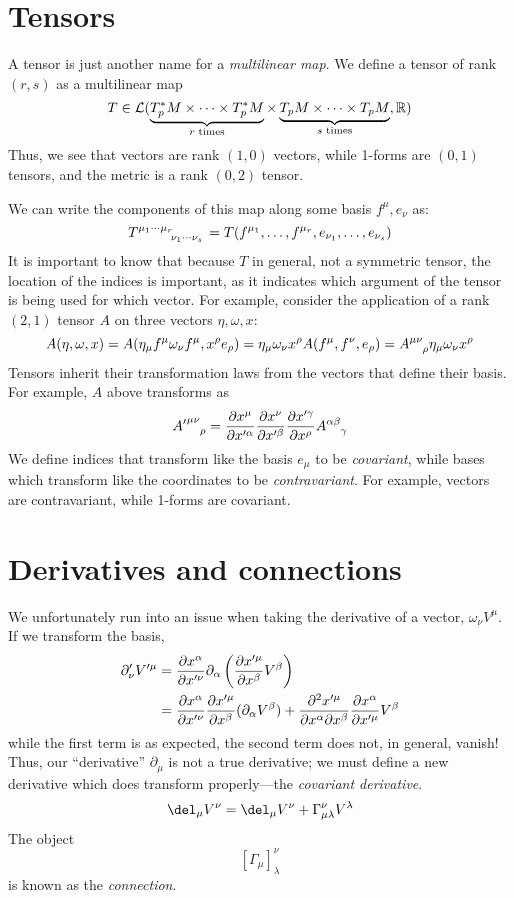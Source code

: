 \section{Tensors}
A tensor is just another name for a \emph{multilinear map}. We define a tensor of rank \((r,s)\) as a multilinear map
\[T\in \L(\underbrace{T_p\ast M\times\cdots\times T_p\ast M}_{\text{\(r\) times}}\times \underbrace{T_p M\times\cdots\times T_p M}_{\text{\(s\) times}}, \R)\]
Thus, we see that vectors are rank \((1,0)\) vectors, while 1-forms are \((0,1)\) tensors, and the metric is a rank \((0,2)\) tensor.

We can write the components of this map along some basis \(f^\mu, e_\nu\) as:
\[T\indices{^{\mu_1}^\cdots^{\mu_r}_{\nu_1}_\cdots_{\nu_s}} = T(f^{\mu_1},\ldots,f^{\mu_r}, e_{\nu_1},\ldots,e_{\nu_s})\]
It is important to know that because \(T\) in general, not a symmetric tensor, the location of the indices is important, as it indicates which argument of the tensor is being used for which vector. For example, consider the application of a rank \((2,1)\) tensor \(A\) on three vectors \(\eta, \omega, x\):
\[A(\eta,\omega,x) = A(\eta_\mu f^\mu \omega_\nu f^\mu, x^\rho e_\rho) = \eta_\mu \omega_\nu x^\rho A(f^\mu, f^\nu, e_\rho) = A\indices{^\mu^\nu_\rho}\eta_\mu\omega_\nu x^\rho\]
Tensors inherit their transformation laws from the vectors that define their basis. For example, \(A\) above transforms as
\[{A'}\indices{^\mu^\nu_\rho} = \pder{x^\mu}{x'^\alpha}\pder{x^\nu}{x'^\beta} \pder{x'^\gamma}{x^\rho}A\indices{^\alpha^\beta_\gamma}\]
We define indices that transform like the basis \(e_\mu\) to be \emph{covariant}, while bases which transform like the coordinates to be \emph{contravariant}. For example, vectors are contravariant, while 1-forms are covariant.

\section{Derivatives and connections}
We unfortunately run into an issue when taking the derivative of a vector, \(\omega_\nu V^\mu\). If we transform the basis,
\begin{align*}
	\partial_\nu' V'^\mu&=\frac{\partial x^\alpha}{\partial x'^\nu}\partial_\alpha\left(\frac{\partial x'^\mu}{\partial x^\beta}V^\beta\right)\\
			    &=\frac{\partial x^\alpha}{\partial x'^\nu}\frac{\partial x'^\mu}{\partial x^\beta}(\partial_\alpha V^\beta) + \frac{\partial ^2 x'^\mu}{\partial x^\alpha\partial x^\beta}\frac{\partial x^\alpha}{\partial x'^\mu}V^\beta
\end{align*}
while the first term is as expected, the second term does not, in general, vanish! Thus, our ``derivative'' \(\partial_\mu\) is not a true derivative; we must define a new derivative which does transform properly---the \emph{covariant derivative}.
\[\del_\mu V^\nu = \del_\mu V^\nu + \Gamma ^\nu_{\mu\lambda}V^\lambda\]
The object
\[[\Gamma_\mu]^\nu_\lambda\]
is known as the \emph{connection}.

